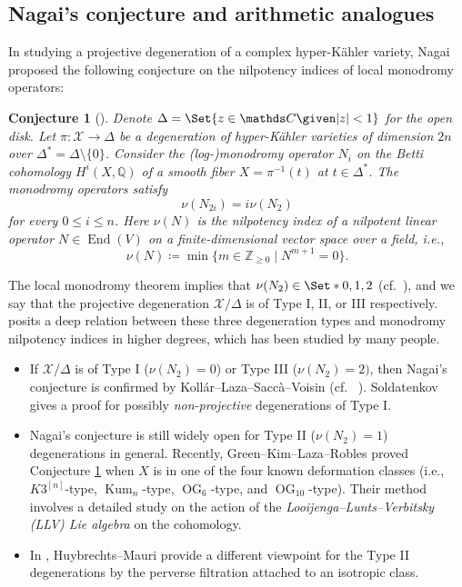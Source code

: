 \documentclass[12pt,reqno]{amsart}
\newtheorem{conj}[thm]{Conjecture}
\theoremstyle{definition}
\newcommand{\Q}{{\mathds Q}}
\newcommand{\Z}{{\mathds Z}}
\newcommand{\C}{{\mathds C}}
\newcommand\End{\mathop{\mathrm{End}}\nolimits}
\newcommand\Kum{\mathop{\mathrm{Kum}}\nolimits}
\newcommand\OG{\mathop{\mathrm{OG}}\nolimits}
\newcommand{\cX}{\mathcal{X}}
\numberwithin{equation}{section}
\begin{document}
\subsection{Nagai's conjecture and arithmetic analogues}

In studying a projective degeneration of a complex hyper-Kähler variety, Nagai proposed the following conjecture on the nilpotency indices of local monodromy operators:
\begin{conj}[{\cite[Conjecture 5.1]{Nagai}}]
\label{Nagai Conjecture over C}
Denote $\Delta = \Set{z \in \C \given \lvert z \rvert <1}$ for the open disk. Let $\pi \colon \cX \to \Delta$ be a degeneration of hyper-Kähler varieties of dimension $2n$  over $\Delta^* =\Delta\setminus\{0\}$.
Consider the (log-)monodromy operator $N_i$ on the Betti cohomology $H^i(X,\Q)$ of a smooth fiber $X= \pi^{-1}(t)$ at $t \in \Delta^*$.
The monodromy operators satisfy
\[ \nu(N_{2i}) = i \nu(N_2) \] for every $0 \leq i \leq n$. Here $\nu(N)$ is the \emph{nilpotency index} of a nilpotent linear operator $N \in \End(V)$ on a finite-dimensional vector space over a field, i.e.,
\[
\nu(N) \coloneqq \min \{m \in \Z_{\geq 0} \mid N^{m+1} = 0\}.
\]
\end{conj}
The local monodromy theorem implies that $\nu(N_2) \in \Set*{0, 1,2}$ (cf.~\cite[(A.2)]{Landman}), and we say that the projective degeneration $\cX/\Delta$ is of Type I, II, or III respectively.  posits a deep relation between these three degeneration types and monodromy nilpotency indices in higher degrees, which has been studied by many people.
\begin{itemize}
    \item If $\cX/\Delta$ is of Type I ($\nu(N_2)=0$) or Type III ($\nu(N_2) =2)$, then Nagai's conjecture is confirmed by Kollár--Laza--Saccà--Voisin (cf.~ \cite[Theorem 1.7, Proposition 7.14 (2)]{KollarLaza2018a}). Soldatenkov \cite[Corollary 3.6]{Soldatenkov20a} gives a proof for possibly \emph{non-projective} degenerations of Type I.
    \item Nagai's conjecture is still widely open for Type II ($\nu(N_2)=1$) degenerations in general. Recently, Green--Kim--Laza--Robles \cite{GKLR} proved Conjecture \ref{Nagai Conjecture over C} when $X$ is in one of the four known deformation classes (i.e., $K3^{[n]}$-type, $\Kum_n$-type, $\OG_6$-type, and $\OG_{10}$-type). Their method involves a detailed study on the action of the \textit{Looijenga--Lunts--Verbitsky (LLV) Lie algebra} on the cohomology.
    \item In \cite{HuybrechtsMauri2023a}, Huybrechts--Mauri provide a different viewpoint for the Type II degenerations by the perverse filtration attached to an isotropic class.
\end{itemize}
\end{document}
